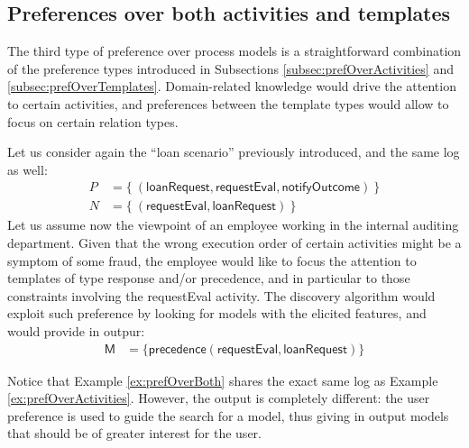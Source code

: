 \subsection{Preferences over both activities and templates}
\label{sub:prefOverBoth}


The third type of preference over process models is a straightforward combination of the preference types introduced in Subsections \ref{subsec:prefOverActivities} and \ref{subsec:prefOverTemplates}. Domain-related knowledge would drive the attention to certain activities, and preferences between the template types would allow to focus on certain relation types.


\begin{example}
\label{ex:prefOverBoth}
Let us consider again the ``loan scenario'' previously introduced, and the same log as well:
%
\begin{align*}
P & = \{\ (\mathsf{loanRequest}, \mathsf{requestEval}, \mathsf{notifyOutcome})\ \} \\
N & = \{\ (\mathsf{requestEval}, \mathsf{loanRequest})\ \}
\end{align*}
%
Let us assume now the viewpoint of an employee working in the internal auditing department. Given that the wrong execution order of certain activities might be a symptom of some fraud, the employee would like to focus the attention to templates of type \textsf{response} and/or \textsf{precedence}, and in particular to those constraints involving the \textsf{requestEval} activity. The discovery algorithm would exploit such preference by looking for models with the elicited features, and would provide in outpur:
%
\begin{align*}
\mathsf{M} & = \{ \mathsf{precedence(requestEval,loanRequest)}\} \tag*{$\square$}
\end{align*}
\end{example}

Notice that Example \ref{ex:prefOverBoth} shares the exact same log as Example \ref{ex:prefOverActivities}. However, the output is completely different: the user preference is used to guide the search for a model, thus giving in output models that should be of greater interest for the user.